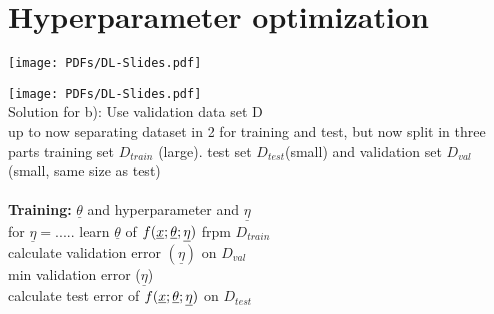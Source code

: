 \section{Hyperparameter optimization}
\texttt{[image: PDFs/DL-Slides.pdf]}

\texttt{[image: PDFs/DL-Slides.pdf]}
 \\
Solution for b): Use validation data set D\\
up to now separating dataset in 2 for training and test, but now split in three parts training set $ D_{train} $ (large). test set $ D_{test} $(small) and validation set $ D_{val} $ (small, same size as test)\\
 \\
\textbf{Training:} $ \underline{\theta} $ and hyperparameter and $ \underline{\eta} $\\
for $ \underline{\eta} = ..... $ learn $ \underline{\theta} $ of $ f({\underline x} ; \underline{\theta} ; \underline{\eta}) $ frpm $  D_{train} $\\
calculate validation error $ (\underline{\eta}) $ on $ D_{val} $\\
min validation error ($ \underline{\eta} $)\\
calculate test error of $ f({\underline x} ; \underline{\theta} ; \underline{\eta}) $ on $ D_{test} $\\
 \\

















